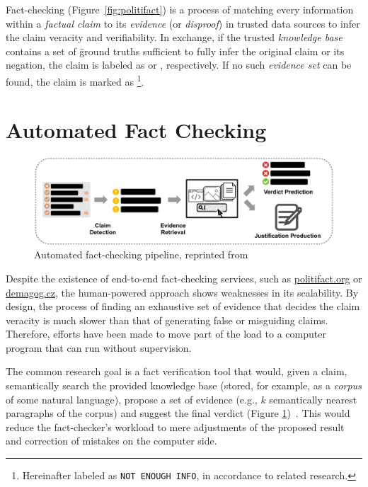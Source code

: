Fact-checking (Figure~\ref{fig:politifact}) is a process of matching every information within a \textit{factual claim} to its \textit{evidence} (or \textit{disproof}) in trusted data sources to infer the claim veracity and verifiability. In exchange, if the trusted \textit{knowledge base} contains a set of \"{ground truths} sufficient to fully infer the original claim or its negation, the claim is labeled as {} or {}, respectively. If no such \textit{evidence set} can be found, the claim is marked as {}\footnote{Hereinafter labeled as \texttt{NOT ENOUGH INFO}, in accordance to related research.}.


\section{Automated Fact Checking}

\begin{figure}
    \includegraphics[width=14cm]{fig/framework.pdf}
    \caption{Automated fact-checking pipeline, reprinted from~\cite{guo-etal-2022-survey}}
    \label{fig:framework}
\end{figure}

Despite the existence of end-to-end fact-checking services, such as \url{politifact.org} or \url{demagog.cz}, the human-powered approach shows weaknesses in its scalability. By design, the process of finding an exhaustive set of evidence that decides the claim veracity is much slower than that of generating false or misguiding claims. Therefore, efforts have been made to move part of the load to a computer program that can run without supervision.

The common research goal is a fact verification tool that would, given a claim, semantically search the provided knowledge base (stored, for example, as a \textit{corpus} of some natural language), propose a set of evidence (e.g., $k$ semantically nearest paragraphs of the corpus) and suggest the final verdict (Figure \ref{fig:framework})~\cite{guo-etal-2022-survey}. This would reduce the fact-checker's workload to mere adjustments of the proposed result and correction of mistakes on the computer side. 

